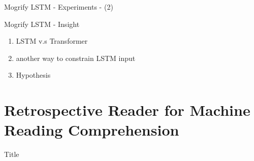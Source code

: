 \documentclass[10pt]{beamer}
\begin{document}
\begin{frame}{Mogrify LSTM - Experiments - (2)}
    
    \begin{figure}
        \begin{center}
        \end{center}
    \end{figure}

\end{frame}

\begin{frame}{Mogrify LSTM - Insight}
    \begin{enumerate}
        \item LSTM v.s Transformer
        \item another way to constrain LSTM input 
        \item Hypothesis
    \end{enumerate}
\end{frame}


\section{Retrospective Reader for Machine Reading Comprehension}

\begin{frame}{Title}
    \begin{figure}
        \begin{center}
        \end{center}
    \end{figure}
    
\end{frame}
\end{document}
